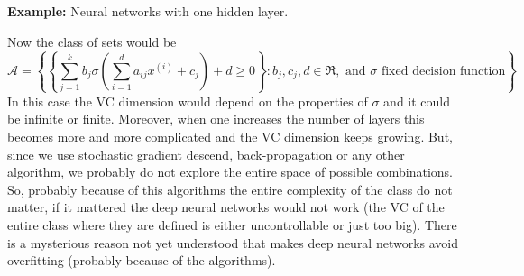\documentclass[11pt, english]{article}
\newcommand{\su}[2]{\sum\limits_{#1}^{#2}}
\begin{document}
\textbf{Example:} Neural networks with one hidden layer. \\

Now the class of sets would be 
\begin{equation}
	\mathcal{A}=\left\{\left\{\su{j=1}{k} b_j \sigma\left(\su{i=1}{d}a_{ij}x^{(i)}+c_j\right)+d\geq 0\right\}:b_j,c_j,d\in\Re,\text{ and }\sigma \text{ fixed decision function}\right\}.
\end{equation}
In this case the VC dimension would depend on the properties of $\sigma$ and it could be infinite or finite. Moreover, when one increases the number of layers this becomes more and more complicated and the VC dimension keeps growing. But, since we use stochastic gradient descend, back-propagation or any other algorithm, we probably do not explore the entire space of possible combinations. So, probably because of this algorithms the entire complexity of the class do not matter, if it mattered the deep neural networks would not work (the VC of the entire class where they are defined is either uncontrollable or just too big). There is a mysterious reason not yet understood that makes deep neural networks avoid overfitting (probably because of the algorithms).\\
\end{document}
